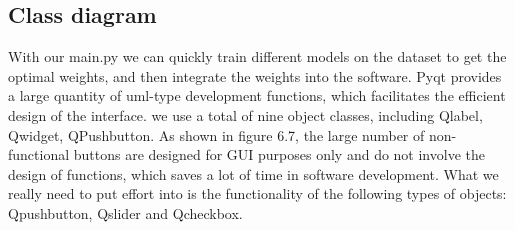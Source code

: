 \subsection{Class diagram} %
\label{sub:amet}
With our main.py we can quickly train different models on the dataset to get the optimal weights, and then integrate the weights into the software. Pyqt provides a large quantity of uml-type development functions, which facilitates the efficient design of the interface. we use a total of nine object classes, including Qlabel, Qwidget, QPushbutton. As shown in figure 6.7, the large number of non-functional buttons are designed for GUI purposes only and do not involve the design of functions, which saves a lot of time in software development. What we really need to put effort into is the functionality of the following types of objects: Qpushbutton, Qslider and Qcheckbox.
